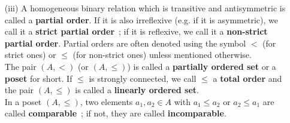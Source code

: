 \begin{definition}
\begin{itemize}
        \item[(iii)] A homogeneous binary relation which is transitive and antisymmetric is called a \textbf{partial order}. If it is also irreflexive (e.g. if it is asymmetric), we call it a \textbf{strict partial order}~; if it is reflexive, we call it a \textbf{non-strict partial order}. Partial orders are often denoted using the symbol $<$ (for strict ones) or $\le$ (for non-strict ones) unless mentioned otherwise. 
        \\

        The pair $(A,<)$ (or $(A, \le)$) is called a \textbf{partially ordered set} or a \textbf{poset} for short. If $\le$ is strongly connected, we call $\le$ a \textbf{total order} and the pair $(A,\le)$ is called a \textbf{linearly ordered set}.
        \\

        In a poset $(A,\le)$, two elements $a_1,a_2 \in A$ with $a_1 \le a_2$ or $a_2 \le a_1$ are called \textbf{comparable}~; if not, they are called \textbf{incomparable}. 
        \\
    \end{itemize}
\end{definition}

